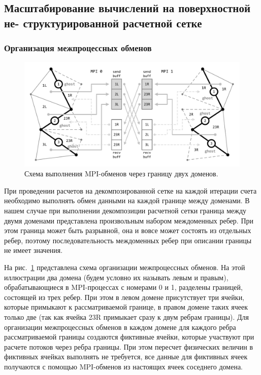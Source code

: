 \subsection{Масштабирование вычислений на поверхностной не- структурированной расчетной сетке}

\subsubsection{Организация межпроцессных обменов}

\begin{figure}[ht]
\centering
\includegraphics[width=1.0\textwidth]{pics/text_2_scaling/mpi.pdf}
\caption{Схема выполнения MPI-обменов через границу двух доменов.}\label{fig:text_2_scaling_mpi}
\end{figure}

При проведении расчетов на декомпозированной сетке на каждой итерации счета необходимо выполнять обмен данными на каждой границе между доменами.
В нашем случае при выполнении декомпозиции расчетной сетки граница между двумя доменами представлена произвольным набором междоменных ребер.
При этом граница может быть разрывной, она и вовсе может состоять из отдельных ребер, поэтому последовательность междоменных ребер при описании границы не имеет значения.

На рис.~\ref{fig:text_2_scaling_mpi} представлена схема организации межпроцессных обменов.
На этой иллюстрации два домена (будем условно их называть левым и правым), обрабатывающиеся в MPI-процессах с номерами 0 и 1, разделены границей, состоящей из трех ребер.
При этом в левом домене присутствует три ячейки, которые примыкают к рассматриваемой границе, в правом домене таких ячеек только две (так как ячейка 23R примыкает сразу к двум ребрам границы).
Для организации межпроцессных обменов в каждом домене для каждого ребра рассматриваемой границы создаются фиктивные ячейки, которые участвуют при расчете потоков через ребра границы.
При этом пересчет физических величин в фиктивных ячейках выполнять не требуется, все данные для фиктивных ячеек получаются с помощью MPI-обменов из настоящих ячеек соседнего домена.

